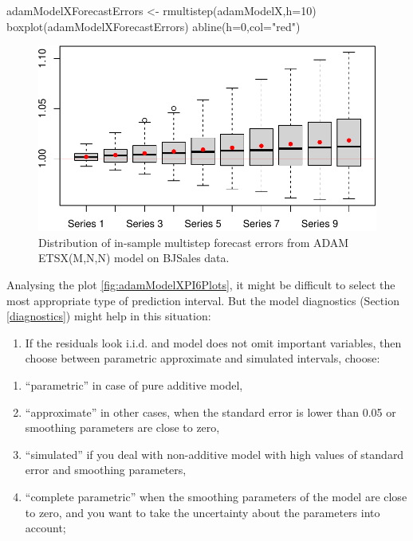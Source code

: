\documentclass[
]{book}
\newenvironment{Shaded}{\begin{snugshade}}{\end{snugshade}}
\newcommand{\AttributeTok}[1]{\textcolor[rgb]{0.77,0.63,0.00}{#1}}
\newcommand{\DecValTok}[1]{\textcolor[rgb]{0.00,0.00,0.81}{#1}}
\newcommand{\FunctionTok}[1]{\textcolor[rgb]{0.00,0.00,0.00}{#1}}
\newcommand{\NormalTok}[1]{#1}
\newcommand{\OtherTok}[1]{\textcolor[rgb]{0.56,0.35,0.01}{#1}}
\newcommand{\StringTok}[1]{\textcolor[rgb]{0.31,0.60,0.02}{#1}}
\providecommand{\tightlist}{%
  \setlength{\itemsep}{0pt}\setlength{\parskip}{0pt}}
\theoremstyle{definition}
\theoremstyle{definition}
\theoremstyle{definition}
\theoremstyle{definition}
\theoremstyle{remark}
\begin{document}
\begin{Shaded}
\begin{Highlighting}[]
\NormalTok{adamModelXForecastErrors }\OtherTok{\textless{}{-}} \FunctionTok{rmultistep}\NormalTok{(adamModelX,}\AttributeTok{h=}\DecValTok{10}\NormalTok{)}
\FunctionTok{boxplot}\NormalTok{(adamModelXForecastErrors)}
\FunctionTok{abline}\NormalTok{(}\AttributeTok{h=}\DecValTok{0}\NormalTok{,}\AttributeTok{col=}\StringTok{"red"}\NormalTok{)}
\end{Highlighting}
\end{Shaded}

\begin{figure}
\centering
\includegraphics{adam_files/figure-latex/adamModelXForecastErrors-1.pdf}
\caption{\label{fig:adamModelXForecastErrors}Distribution of in-sample multistep forecast errors from ADAM ETSX(M,N,N) model on BJSales data.}
\end{figure}

Analysing the plot \ref{fig:adamModelXPI6Plots}, it might be difficult to select the most appropriate type of prediction interval. But the model diagnostics (Section \ref{diagnostics}) might help in this situation:

\begin{enumerate}
\def\labelenumi{\arabic{enumi}.}
\tightlist
\item
  If the residuals look i.i.d. and model does not omit important variables, then choose between parametric approximate and simulated intervals, choose:
\end{enumerate}

\begin{enumerate}
\def\labelenumi{\alph{enumi}.}
\tightlist
\item
  ``parametric'' in case of pure additive model,
\item
  ``approximate'' in other cases, when the standard error is lower than 0.05 or smoothing parameters are close to zero,
\item
  ``simulated'' if you deal with non-additive model with high values of standard error and smoothing parameters,
\item
  ``complete parametric'' when the smoothing parameters of the model are close to zero, and you want to take the uncertainty about the parameters into account;
\end{enumerate}
\end{document}
